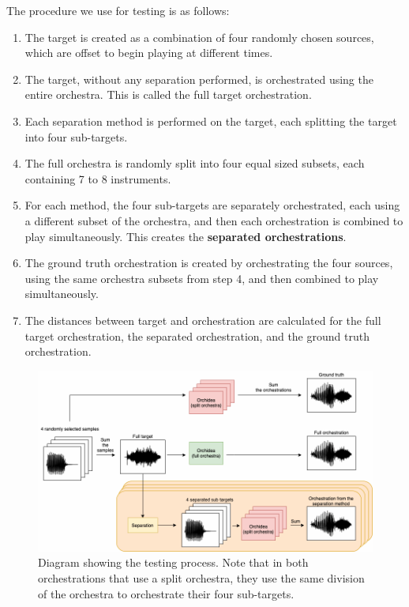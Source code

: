 \documentclass[letterpaper]{article}  %
\begin{document}
    The procedure we use for testing is as follows:
    \begin{enumerate}
      \item The target is created as a combination of four randomly chosen sources, which are offset to begin playing at different times.
      \item The target, without any separation performed, is orchestrated using the entire orchestra. This is called the full target orchestration.
      \item Each separation method is performed on the target, each splitting the target into four sub-targets.
      \item The full orchestra is randomly split into four equal sized subsets, each containing 7 to 8 instruments.
      \item For each method, the four sub-targets are separately orchestrated, each using a different subset of the orchestra, and then each orchestration is combined to play simultaneously. This creates the \textbf{separated orchestrations}.
      \item The ground truth orchestration is created by orchestrating the four sources, using the same orchestra subsets from step 4, and then combined to play simultaneously.
      \item The distances between target and orchestration are calculated for the full target orchestration, the separated orchestration, and the ground truth orchestration.
    \end{enumerate}

    \begin{figure}[t]
      \centering
        \includegraphics[width=\columnwidth]{figures/evaluation_diagram.png}
        \caption{Diagram showing the testing process. Note that in both orchestrations that use a split orchestra, they use the same division of the orchestra to orchestrate their four sub-targets.}\label{fig:eval_diagram}
    \end{figure}
\end{document}
